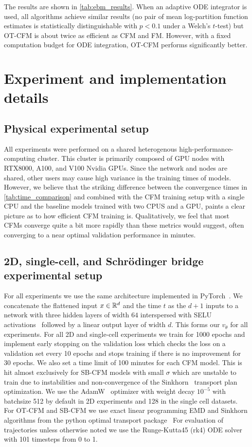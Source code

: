 \documentclass[10pt]{article}
\theoremstyle{plain}
\theoremstyle{definition}
\theoremstyle{remark}
\begin{document}
The results are shown in \autoref{tab:ebm_results}. When an adaptive ODE integrator is used, all algorithms achieve similar results (no pair of mean log-partition function estimates is statistically distinguishable with $p<0.1$ under a Welch's $t$-test) but OT-CFM is about twice as efficient as CFM and FM. However, with a fixed computation budget for ODE integration, OT-CFM performs significantly better.

\section{Experiment and implementation details}
\label{app:details}

%
\subsection{Physical experimental setup}
All experiments were performed on a shared heterogenous high-performance-computing cluster. This cluster is primarily composed of GPU nodes with RTX8000, A100, and V100 Nvidia GPUs. Since the network and nodes are shared, other users may cause high variance in the training times of models. However, we believe that the striking difference between the convergence times in \autoref{tab:time_comparison} and combined with the CFM training setup with a single CPU and the baseline models trained with two CPUS and a GPU, paints a clear picture as to how efficient CFM training is. Qualitatively, we feel that most CFMs converge quite a bit more rapidly than these metrics would suggest, often converging to a near optimal validation performance in minutes. 

\subsection{2D, single-cell, and Schr\"odinger bridge experimental setup}

For all experiments we use the same architecture implemented in PyTorch~\citep{paszke_pytorch_2019}. We concatenate the flattened input $x \in \mathbb{R}^d$ and the time $t$ as the $d+1$ inputs to a network with three hidden layers of width $64$ interspersed with SELU activations~\citep{klambauer_self-normalizing_2017} followed by a linear output layer of width $d$. This forms our $v_\theta$ for all experiments. For all 2D and single-cell experiments we train for 1000 epochs and implement early stopping on the validation loss which checks the loss on a validation set every 10 epochs and stops training if there is no improvement for 30 epochs. We also set a time limit of 100 minutes for each CFM model. This is hit almost exclusively for SB-CFM models with small $\sigma$ which are unstable to train due to instabilities and non-convergence of the Sinkhorn~\citep{cuturi_sinkhorn_2013} transport plan optimization. We use the AdamW~\citep{loshchilov_decoupled_2019} optimizer with weight decay $10^{-5}$ with batchsize 512 by default in 2D experiments and 128 in the single cell datasets. For OT-CFM and SB-CFM we use exact linear programming EMD and Sinkhorn algorithms from the python optimal transport package~\citep{flamary_pot_2021} For evaluation of trajectories unless otherwise noted we use the Runge-Kutta45 (rk4) ODE solver with 101 timesteps from 0 to 1.
\end{document}
